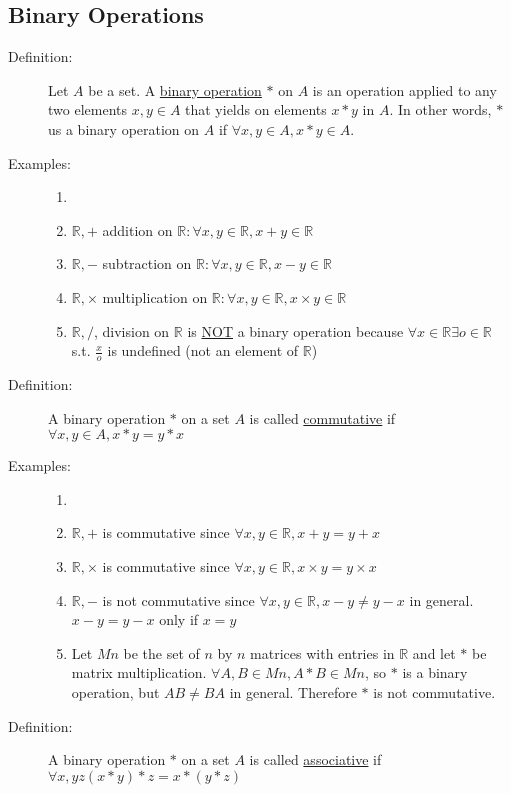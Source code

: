\documentclass[10pt]{article}
\begin{document}
	\subsection{Binary Operations}
	\begin{description}
		\item[Definition:] Let $A$ be a set. A \underline{binary operation} $*$ on $A$ is an operation applied to any two elements $x, y \in A$ that yields on elements $x*y$ in $A$. In other words, $*$ us a binary operation on $A$ if $\forall x, y \in A, x*y \in A$.
		\item[Examples:]
		\begin{enumerate}
			\item[]
			\item $\mathbb{R}, +$ addition on $\mathbb{R}: \forall x, y \in \mathbb{R}, x+y \in \mathbb{R}$
			\item $\mathbb{R}, -$ subtraction on $\mathbb{R}: \forall x, y \in \mathbb{R}, x-y \in \mathbb{R}$
			\item $\mathbb{R}, \times$ multiplication on $\mathbb{R}: \forall x, y \in \mathbb{R}, x \times y \in \mathbb{R}$
			\item $\mathbb{R}, /$, division on $\mathbb{R}$ is \underline{NOT} a binary operation because $\forall x \in \mathbb{R} \exists o \in \mathbb{R}$ s.t. $\frac{x}{o}$ is undefined (not an element of $\mathbb{R}$)
		\end{enumerate}
		\item[Definition:] A binary operation $*$ on a set $A$ is called \underline{commutative} if $\forall x, y \in A, x*y=y*x$
		\item[Examples:]
		\begin{enumerate}
			\item[]
			\item $\mathbb{R}, +$ is commutative since $\forall x, y \in \mathbb{R}, x+y=y+x$
			\item $\mathbb{R}, \times$ is commutative since $\forall x, y \in \mathbb{R}, x \times y = y \times x$
			\item $\mathbb{R}, -$ is not commutative since $\forall x, y \in \mathbb{R}, x-y \neq y-x$ in general. $x-y=y-x$ only if $x=y$
			\item Let $Mn$ be the set of $n$ by $n$ matrices with entries in $\mathbb{R}$ and let $*$ be matrix multiplication. $\forall A, B \in Mn, A*B \in Mn$, so $*$ is a binary operation, but $AB \neq BA$ in general. Therefore $*$ is not commutative.
		\end{enumerate}
		\item[Definition:] A binary operation $*$ on a set $A$ is called \underline{associative} if $\forall x, y z (x*y)*z = x*(y*z)$

\end{description}
\end{document}
